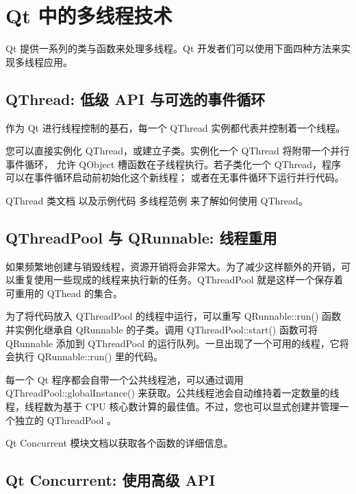 \chapter{Qt 中的多线程技术}

Qt 提供一系列的类与函数来处理多线程。Qt 开发者们可以使用下面四种方法来实现多线程应用。

\section{QThread: 低级 API 与可选的事件循环}

作为 Qt 进行线程控制的基石，每一个 QThread 实例都代表并控制着一个线程。

您可以直接实例化 QThread，或建立子类。实例化一个 QThread 将附带一个并行事件循环，
允许 QObject 槽函数在子线程执行。若子类化一个 QThread，程序可以在事件循环启动前初始化这个新线程；
或者在无事件循环下运行并行代码。

\begin{seeAlso}
QThread 类文档 以及示例代码 多线程范例 来了解如何使用 QThread。
\end{seeAlso}

\section{QThreadPool 与 QRunnable: 线程重用}

如果频繁地创建与销毁线程，资源开销将会非常大。为了减少这样额外的开销，可以重复使用一些现成的线程来执行新的任务。QThreadPool 就是这样一个保存着可重用的 QThead 的集合。

为了将代码放入 QThreadPool 的线程中运行，可以重写 QRunnable::run() 函数并实例化继承自 QRunnable 的子类。调用 QThreadPool::start() 函数可将 QRunnable 添加到 QThreadPool 的运行队列。一旦出现了一个可用的线程，它将会执行 QRunnable::run() 里的代码。

每一个 Qt 程序都会自带一个公共线程池，可以通过调用 QThreadPool::globalInstance() 来获取。公共线程池会自动维持着一定数量的线程，线程数为基于 CPU 核心数计算的最佳值。不过，您也可以显式创建并管理一个独立的 QThreadPool 。

\begin{seeAlso}
Qt Concurrent 模块文档以获取各个函数的详细信息。
\end{seeAlso}
    
\section{Qt Concurrent: 使用高级 API}

